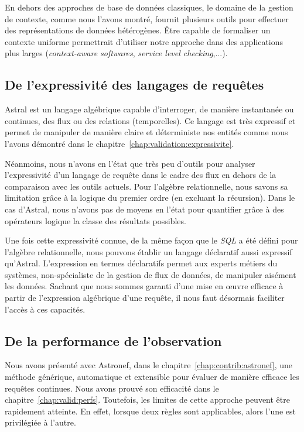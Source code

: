 En dehors des approches de base de données classiques, le domaine de la gestion de contexte, comme nous l'avons montré, fournit plusieurs outils pour effectuer des représentations de données hétérogènes. Être capable de formaliser un contexte uniforme permettrait d'utiliser notre approche dans des applications plus larges (\textit{context-aware softwares}, \textit{service level checking},...).

\subsection{De l'expressivité des langages de requêtes}
Astral est un langage algébrique capable d'interroger, de manière instantanée ou continues, des flux ou des relations (temporelles). Ce langage est très expressif et permet de manipuler de manière claire et déterministe nos entités comme nous l'avons démontré dans le chapitre~\ref{chap:validation:expressivite}.

Néanmoins, nous n'avons en l'état que très peu d'outils pour analyser l'expressivité d'un langage de requête dans le cadre des flux en dehors de la comparaison avec les outils actuels. Pour l'algèbre relationnelle, nous savons sa limitation grâce à la logique du premier ordre (en excluant la récursion). Dans le cas d'Astral, nous n'avons pas de moyens en l'état pour quantifier grâce à des opérateurs logique la classe des résultats possibles.

Une fois cette expressivité connue, de la même façon que le \textit{SQL} a été défini pour l'algèbre relationnelle, nous pouvons établir un langage déclaratif aussi expressif qu'Astral. L'expression en termes déclaratifs permet aux experts métiers du systèmes, non-spécialiste de la gestion de flux de données, de manipuler aisément les données. Sachant que nous sommes garanti d'une mise en œuvre efficace à partir de l'expression algébrique d'une requête, il nous faut désormais faciliter l'accès à ces capacités.

\subsection{De la performance de l'observation}
Nous avons présenté avec Astronef, dans le chapitre~\ref{chap:contrib:astronef}, une méthode générique, automatique et extensible pour évaluer de manière efficace les requêtes continues. Nous avons prouvé son efficacité dans le chapitre~\ref{chap:valid:perfs}. Toutefois, les limites de cette approche peuvent être rapidement atteinte. En effet, lorsque deux règles sont applicables, alors l'une est privilégiée à l'autre.

